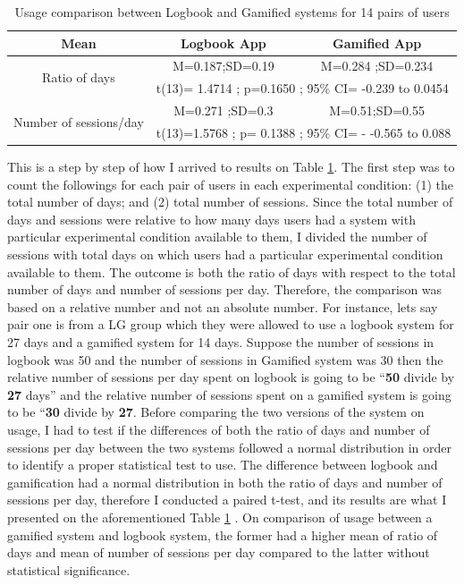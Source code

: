 \begin{table}[h!]

  \begin{center}
    \caption{Usage comparison between Logbook and Gamified systems for 14 pairs of users}
    \label{table:usagewellness1}
	\begin{tabular}{|c|c|c|}
		\hline
		Mean &Logbook App&Gamified App\\
		\hline
		 \multirow{2}{*}{Ratio of days}&M=0.187;SD=0.19&M=0.284 ;SD=0.234\\\cline{2-3} 

		 &\multicolumn{2}{|l|}{t(13)= 1.4714 ; p=0.1650 ; 95\% CI=  -0.239 to 0.0454 } \\
\hline
   		 \multirow{2}{*}{ Number of sessions/day}&M=0.271 ;SD=0.3&M=0.51;SD=0.55\\\cline{2-3} 
		
		 &\multicolumn{2}{|l|}{t(13)=1.5768 ; p= 0.1388 ; 95\% CI= - -0.565 to 0.088} \\
\hline

	\end{tabular}
  \end{center}
\end{table}
\newline 
This is a step by step of how I arrived to results on Table \ref{table:usagewellness1}. The first step was to count the followings for each pair of users in each experimental condition: (1) the total number of days; and  (2) total number of sessions. Since the total number of days and sessions were relative to how many days users had a system with particular experimental condition available to them, I divided the number of sessions with total days on which users had a particular experimental condition available to them. The outcome is both the ratio of days with respect to the total number of days and number of sessions per day. Therefore, the comparison was based on a relative number and not an absolute number. For instance, lets say pair one is from a LG group which they were allowed to use a logbook system for 27 days and a gamified system for 14 days. Suppose the number of sessions in logbook was 50 and the number of sessions in Gamified system was 30 then the relative number of sessions per day spent on logbook is going to be ``\textbf{50} divide by \textbf{27} days'' and the relative number of sessions spent on  a gamified system is going to be ``\textbf{30} divide by \textbf{27}. Before comparing the two versions of the system on usage, I had to test if the differences of both the ratio of days and number of sessions per day between the two systems followed a normal distribution in order to identify a proper statistical test to use. The difference between logbook and gamification had a normal distribution in both the ratio of days and number of sessions per day, therefore I conducted a paired t-test, and its results are what I presented on the aforementioned Table \ref{table:usagewellness1} . On comparison of usage between a gamified system and logbook system, the former had a higher mean  of ratio of days  and mean of number of sessions per day compared to the latter without statistical significance.\newline 
